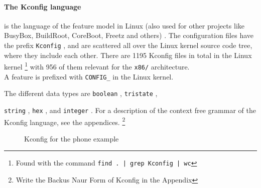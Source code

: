 \documentclass[a4paper,11pt]{report}
\newcommand{\textcode}[1]{
    \fboxsep=1pt
    \texttt{\colorbox{gray!20}{#1}}
}
\newcommand{\figa}{
    \begin{figure}[!htpb]
    \centering
}
\newcommand{\figb}[2]{
    \caption{#1}
    \label{#2}
    \end{figure}
}
\begin{document}
            \paragraph{The Kconfig language} 
is the language of the feature model in Linux (also used for other projects 
like BusyBox, BuildRoot, CoreBoot, Freetz and others)
    \cite[p. 4]{VarModSSD}
.
The configuration files have the prefix \textcode{Kconfig}, and are 
scattered all over the Linux kernel source code tree, where they include each 
other. There are 1195 Kconfig files in total in the Linux kernel
    \footnote{Found with the command \textcode{find . | grep Kconfig | wc}}
with 956 of them relevant for the \texttt{x86/} architecture.
\\

A feature is prefixed with \textcode{CONFIG\_} in the Linux kernel.

The different data types are \textcode{boolean}, \textcode{tristate}, 
\textcode{string}, \textcode{hex}, and \textcode{integer}. For a description of 
the context free grammar of the Kconfig language, see the appendices.
    \footnote{Write the Backus Naur Form of Kconfig in the Appendix}
\\

\figa
    
\figb{Kconfig for the phone example}{kconfigphone}
\end{document}
